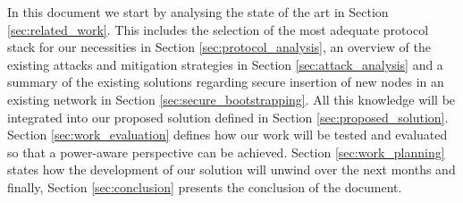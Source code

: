 In this document we start by analysing the state of the art in Section \ref{sec:related_work}. This includes the selection of the most adequate protocol stack for our necessities in Section \ref{sec:protocol_analysis}, an overview of the existing attacks and mitigation strategies in Section \ref{sec:attack_analysis} and a summary of the existing solutions regarding secure insertion of new nodes in an existing network in Section \ref{sec:secure_bootstrapping}. All this knowledge will be integrated into our proposed solution defined in Section \ref{sec:proposed_solution}. Section \ref{sec:work_evaluation} defines how our work will be tested and evaluated so that a power-aware perspective can be achieved. Section \ref{sec:work_planning} states how the development of our solution will unwind over the next months and finally, Section \ref{sec:conclusion} presents the conclusion of the document.